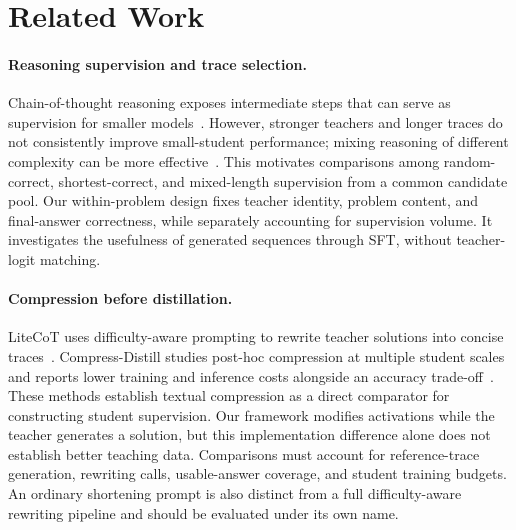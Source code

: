 \section{Related Work}
\label{sec:related_work}

\paragraph{Reasoning supervision and trace selection.}
Chain-of-thought reasoning exposes intermediate steps that can serve as supervision for smaller models~\citep{wei2022chain,hsieh2023distilling}.
However, stronger teachers and longer traces do not consistently improve small-student performance; mixing reasoning of different complexity can be more effective~\citep{li2025small}.
This motivates comparisons among random-correct, shortest-correct, and mixed-length supervision from a common candidate pool.
Our within-problem design fixes teacher identity, problem content, and final-answer correctness, while separately accounting for supervision volume.
It investigates the usefulness of generated sequences through SFT, without teacher-logit matching.

\paragraph{Compression before distillation.}
LiteCoT uses difficulty-aware prompting to rewrite teacher solutions into concise traces~\citep{wu2025concise}.
Compress-Distill studies post-hoc compression at multiple student scales and reports lower training and inference costs alongside an accuracy trade-off~\citep{griot2026compress}.
These methods establish textual compression as a direct comparator for constructing student supervision.
Our framework modifies activations while the teacher generates a solution, but this implementation difference alone does not establish better teaching data.
Comparisons must account for reference-trace generation, rewriting calls, usable-answer coverage, and student training budgets.
An ordinary shortening prompt is also distinct from a full difficulty-aware rewriting pipeline and should be evaluated under its own name.

